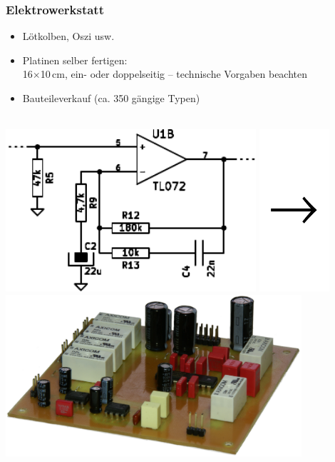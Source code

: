 \documentclass[t]{beamer}
\begin{document}
\begin{frame}
	\frametitle{Elektrowerkstatt}
	\begin{itemize}
		\item Lötkolben, Oszi usw.
		\item Platinen selber fertigen:\\
			16$\times$10\,cm, ein- oder doppelseitig -- technische Vorgaben beachten
		\item Bauteileverkauf (ca. 350 gängige Typen)
	\end{itemize}
		\begin{center}
	~\\
		\includegraphics[height=6cm]{../img/schaltplan.pdf}
		\includegraphics[height=6cm]{../img/pfeil.pdf}
		\includegraphics[height=6cm]{../img/platine_perspektivisch.png}
	\end{center}
\end{frame}
\end{document}

